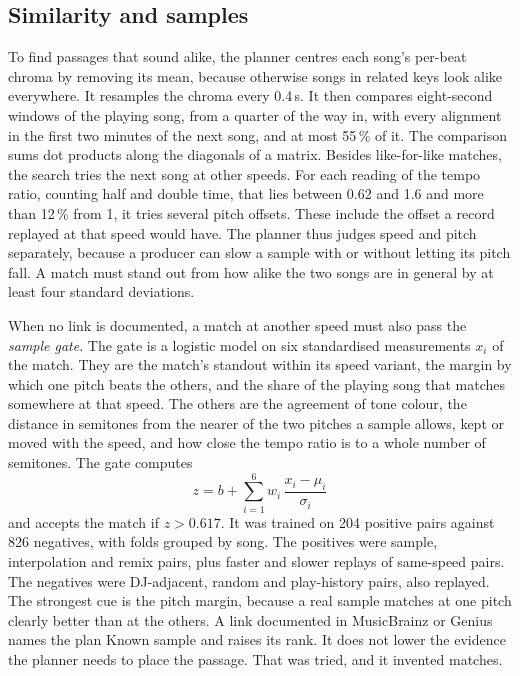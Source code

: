 \documentclass[conference,a4paper]{IEEEtran}
\newcommand{\q}[1]{\textquotedbl{}#1\textquotedbl{}}
\begin{document}
\subsection{Similarity and samples}
To find passages that sound alike, the planner centres each song's per-beat chroma by removing its
mean, because otherwise songs in related keys look alike everywhere. It resamples the chroma every
0.4\,s. It then compares eight-second windows of the playing song, from a quarter of the way in,
with every alignment in the first two minutes of the next song, and at most 55\,\% of it. The
comparison sums dot products along the diagonals of a matrix. Besides like-for-like matches, the
search tries the next song at other speeds. For each reading of the tempo ratio, counting half and
double time, that lies between 0.62 and 1.6 and more than 12\,\% from 1, it tries several pitch
offsets. These include the offset a record replayed at that speed would have. The planner thus
judges speed and pitch separately, because a producer can slow a sample with or without letting its
pitch fall. A match must stand out from how alike the two songs are in general by at least four
standard deviations.

When no link is documented, a match at another speed must also pass the \emph{sample gate}. The
gate is a logistic model on six standardised measurements $x_i$ of the match. They are the match's
standout within its speed variant, the margin by which one pitch beats the others, and the share of
the playing song that matches somewhere at that speed. The others are the agreement of tone colour,
the distance in semitones from the nearer of the two pitches a sample allows, kept or moved with
the speed, and how close the tempo ratio is to a whole number of semitones. The gate computes
\begin{equation}
z=b+\sum_{i=1}^{6} w_i\,\frac{x_i-\mu_i}{\sigma_i}
\end{equation}
and accepts the match if $z>0.617$. It was trained on 204 positive pairs against 826 negatives,
with folds grouped by song. The positives were sample, interpolation and remix pairs, plus faster
and slower replays of same-speed pairs. The negatives were DJ-adjacent, random and play-history
pairs, also replayed. The strongest cue is the pitch margin, because a real sample matches at one
pitch clearly better than at the others. A link documented in MusicBrainz or Genius names the plan
\q{Known sample} and raises its rank. It does not lower the evidence the planner needs to place the
passage. That was tried, and it invented matches.
\end{document}
